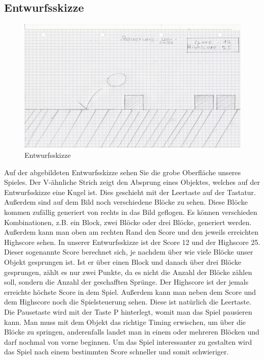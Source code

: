 \subsection{Entwurfsskizze}
\begin{figure}[htb]
	\centering
	\includegraphics[scale=0.22]{content/pictures/entwurfsskizze.png}
	\caption{Entwurfsskizze}
\end{figure}
\noindent
Auf der abgebildeten Entwurfsskizze sehen Sie die grobe Oberfläche unseres Spieles. Der V-ähnliche Strich zeigt den Absprung eines Objektes, welches auf der Entwurfsskizze eine Kugel ist. Dies geschieht mit der Leertaste auf der Tastatur. Außerdem sind auf dem Bild noch verschiedene Blöcke zu sehen. Diese Blöcke kommen zufällig generiert von rechts in das Bild geflogen. Es können verschieden Kombinationen, z.B. ein Block, zwei Blöcke oder drei Blöcke, generiert werden. Außerdem kann man oben am rechten Rand den Score und den jeweils erreichten Highscore sehen. In unserer Entwurfsskizze ist der Score 12 und der Highscore 25. Dieser sogenannte Score berechnet sich, je nachdem über wie viele Blöcke unser Objekt gesprungen ist. Ist er über einen Block und danach über drei Blöcke gesprungen, zählt es nur zwei Punkte, da es nicht die Anzahl der Blöcke zählen soll, sondern die Anzahl der geschafften Sprünge. Der Highscore ist der jemals erreichte höchste Score in dem Spiel. Außerdem kann man neben dem Score und dem Highscore noch die Spielsteuerung sehen. Diese ist natürlich die Leertaste. Die Pausetaste wird mit der Taste P hinterlegt, womit man das Spiel pausieren kann. Man muss mit dem Objekt das richtige Timing erwischen, um über die Blöcke zu springen, anderenfalls landet man in einem oder mehreren Blöcken und darf nochmal von vorne beginnen. Um das Spiel interessanter zu gestalten wird das Spiel nach einem bestimmten Score schneller und somit schwieriger.
\newpage
